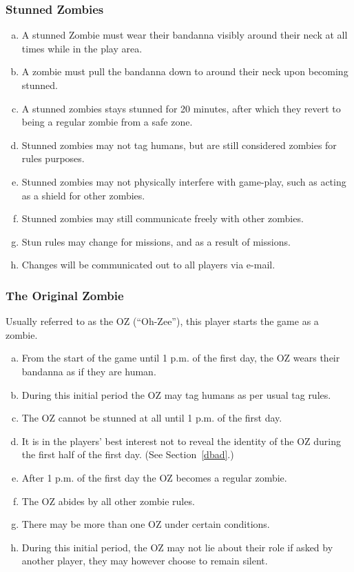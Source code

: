 \documentclass[a4paper,12pt]{article}
\begin{document}
\subsubsection{Stunned Zombies}
\label{StunnedZombies}
\begin{enumerate}[(a)]
    \item A stunned Zombie must wear their bandanna visibly around their neck at all times while in the play area.
    \item A zombie must pull the bandanna down to around their neck upon becoming stunned.
    \item A stunned zombies stays stunned for 20 minutes, after which they revert to being a regular zombie from a safe zone.
    \item Stunned zombies may not tag humans, but are still considered zombies for rules purposes.
    \item Stunned zombies may not physically interfere with game-play, such as acting as a shield for other zombies.
    \item Stunned zombies may still communicate freely with other zombies.
    \item Stun rules may change for missions, and as a result of missions. 
    \item Changes will be communicated out to all players via e-mail.
\end{enumerate}


\subsubsection{The Original Zombie}
\label{OZrules}
Usually referred to as the OZ (``Oh-Zee''), this player starts the game as a zombie.

\begin{enumerate}[(a)]
    \item From the start of the game until 1 p.m. of the first day, the OZ wears their bandanna as if they are human. 
    \item During this initial period the OZ may tag humans as per usual tag rules.
    \item The OZ cannot be stunned at all until 1 p.m. of the first day.
    \item It is in the players' best interest not to reveal the identity of the OZ during the first half of the first day. (See Section~\ref{dbad}.)
    \item After 1 p.m. of the first day the OZ becomes a regular zombie.
    \item The OZ abides by all other zombie rules.
    \item There may be more than one OZ under certain conditions.
    \item During this initial period, the OZ may not lie about their role if asked by another player, they may however choose to remain silent. 
\end{enumerate}
\end{document}

